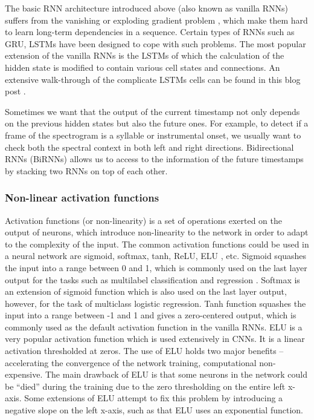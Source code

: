 The basic \gls{RNN} architecture introduced above (also known as vanilla \gls{RNN}s) suffers from the vanishing or exploding gradient problem \cite{Pascanu2013}, which make them hard to learn long-term dependencies in a sequence. Certain types of \gls{RNN}s such as \gls{GRU}, \gls{LSTM}s have been designed to cope with such problems. The most popular extension of the vanilla \gls{RNN}s is the \gls{LSTM}s \cite{Hochreiter1997} of which the calculation of the hidden state is modified to contain various cell states and connections. An extensive walk-through of the complicate \gls{LSTM}s cells can be found in this blog post \cite{Olah2015}. 

Sometimes we want that the output of the current timestamp not only depends on the previous hidden states but also the future ones. For example, to detect if a frame of the spectrogram is a syllable or instrumental onset, we usually want to check both the spectral context in both left and right directions. Bidirectional \gls{RNN}s (BiRNNs) \cite{Schuster1997} allows us to access to the information of the future timestamps by stacking two \gls{RNN}s on top of each other.

\subsubsection{Non-linear activation functions}

Activation functions (or non-linearity) is a set of operations exerted on the output of neurons, which introduce non-linearity to the network in order to adapt to the complexity of the input. The common activation functions could be used in a neural network are sigmoid, softmax, tanh, \gls{ReLU}, \gls{ELU} \cite{Clevert2015}, etc. Sigmoid squashes the input into a range between 0 and 1, which is commonly used on the last layer output for the tasks such as multilabel classification and regression \cite{Stanforduniversity}. Softmax is an extension of sigmoid function which is also used on the last layer output, however, for the task of multiclass logistic regression. Tanh function squashes the input into a range between -1 and 1 and gives a zero-centered output, which is commonly used as the default activation function in the vanilla \gls{RNN}s. \gls{ELU} is a very popular activation function which is used extensively in \gls{CNN}s. It is a linear activation thresholded at zeros. The use of \gls{ELU} holds two major benefits -- accelerating the convergence of the network training, computational non-expensive. The main drawback of \gls{ELU} is that some neurons in the network could be ``died” during the training due to the zero thresholding on the entire left x-axis. Some extensions of \gls{ELU} attempt to fix this problem by introducing a negative slope on the left x-axis, such as that \gls{ELU} uses an exponential function.

